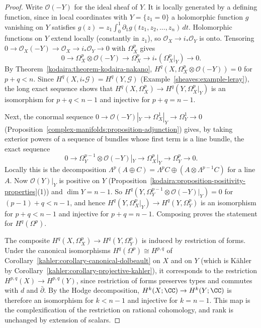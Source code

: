 \begin{proof}
Write $\mathcal{O}(-Y)$ for the ideal sheaf of $Y$. It is locally generated by a defining function, since in local coordinates with
$Y = \{z_1 = 0\}$ a holomorphic function $g$ vanishing on $Y$ satisfies $g(z) = z_1\int_0^1\partial_1g(tz_1, z_2, \ldots, z_n)\,dt$. Holomorphic
functions on $Y$ extend locally (constantly in $z_1$), so $\mathcal{O}_X \to i_*\mathcal{O}_Y$ is onto. Tensoring $0 \to \mathcal{O}_X(-Y) \to \mathcal{O}_X \to i_*\mathcal{O}_Y \to 0$ with $\Omega^p_X$ gives
\[
0 \to \Omega^p_X \otimes \mathcal{O}(-Y) \to \Omega^p_X \to i_*(\Omega^p_X|_Y) \to 0 .
\]
By Theorem~\ref{kodaira:theorem-kodaira-nakano}, $H^q(X, \Omega^p_X \otimes \mathcal{O}(-Y)) = 0$ for $p + q < n$. Since
$H^q(X, i_*\mathcal{G}) = H^q(Y, \mathcal{G})$ (Example~\ref{sheaves:example-leray}), the long exact sequence shows that
$H^q(X, \Omega^p_X) \to H^q(Y, \Omega^p_X|_Y)$ is an isomorphism for $p + q < n - 1$ and injective for $p + q = n - 1$.

Next, the conormal sequence $0 \to \mathcal{O}(-Y)|_Y \to \Omega^1_X|_Y \to \Omega^1_Y \to 0$
(Proposition~\ref{complex-manifolds:proposition-adjunction}) gives, by taking exterior powers of a sequence of bundles whose first term is a
line bundle, the exact sequence
\[
0 \to \Omega^{p-1}_Y \otimes \mathcal{O}(-Y)|_Y \to \Omega^p_X|_Y \to \Omega^p_Y \to 0 .
\]
Locally this is the decomposition $\Lambda^p(A \oplus C) = \Lambda^p C \oplus (A \otimes \Lambda^{p-1}C)$ for a line $A$. Now $\mathcal{O}(Y)|_Y$ is
positive on $Y$ (Proposition~\ref{kodaira:proposition-positivity-properties}(1)) and $\dim Y = n - 1$. So
$H^q(Y, \Omega^{p-1}_Y \otimes \mathcal{O}(-Y)|_Y) = 0$ for $(p - 1) + q < n - 1$, and hence
$H^q(Y, \Omega^p_X|_Y) \to H^q(Y, \Omega^p_Y)$ is an isomorphism for $p + q < n - 1$ and injective for $p + q = n - 1$. Composing proves the
statement for $H^q(\Omega^p)$.

The composite $H^q(X, \Omega^p_X) \to H^q(Y, \Omega^p_Y)$ is induced by restriction of forms. Under the canonical isomorphisms
$H^q(\Omega^p) \cong H^{p,q}$ of Corollary~\ref{kahler:corollary-canonical-dolbeault} on $X$ and on $Y$ (which is K\"ahler by
Corollary~\ref{kahler:corollary-projective-kahler}), it corresponds to the restriction $H^{p,q}(X) \to H^{p,q}(Y)$, since restriction of forms
preserves types and commutes with $d$ and $\bar\partial$. By the Hodge decomposition, $H^k(X; \CC) \to H^k(Y; \CC)$ is therefore an isomorphism
for $k < n - 1$ and injective for $k = n - 1$. This map is the complexification of the restriction on rational cohomology, and rank is
unchanged by extension of scalars.
\end{proof}

